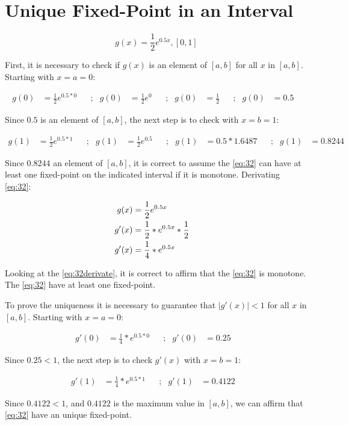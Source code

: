 \section{Unique Fixed-Point in an Interval}
	
	\begin{equation}
		g(x) = \frac{1}{2}e^{0.5x},[0,1]
	\label{eq:32}
	\end{equation}
		
	First, it is necessary to check if $g(x)$ is an element of $[a,b]$ for all $x$ in $[a,b]$. Starting with $x = a = 0$:
	
	\begin{align}
		g(0) &= \frac{1}{2}e^{0.5*0}& &;&
		g(0) &= \frac{1}{2}e^{0}& &;&
		g(0) &= \frac{1}{2}& &;&
		g(0) &= 0.5&
	\label{eq:320x}
	\end{align}

	Since $0.5$ is an element of $[a,b]$, the next step is to check with $x = b = 1$:

	\begin{align}
		g(1) &= \frac{1}{2}e^{0.5*1}& &;&
		g(1) &= \frac{1}{2}e^{0.5}& &;&
		g(1) &= 0.5*1.6487& &;&
		g(1) &= 0.8244&
	\label{eq:321x}
	\end{align}

	Since $0.8244$ an element of $[a,b]$, it is correct to assume the \cref{eq:32} can have at least one fixed-point on the indicated interval if it is monotone. Derivating \cref{eq:32}:

	\begin{align}
		g(x) &= \frac{1}{2}e^{0.5x}& \notag \\
		g'(x) &= \frac{1}{2}*e^{0.5x}*\frac{1}{2}& \notag \\
		g'(x) &= \frac{1}{4}*e^{0.5x}&
	\label{eq:32derivate}
	\end{align}

	Looking at the \cref{eq:32derivate}, it is correct to affirm that the \cref{eq:32} is monotone. The \cref{eq:32} have at least one fixed-point.

	To prove the uniqueness it is necessary to guarantee that $|g'(x)| < 1$ for all $x$ in $[a,b]$. Starting with $x = a = 0$:

	\begin{align}
		g'(0) &= \frac{1}{4}*e^{0.5*0}& &;&
		g'(0) &= 0.25&
	\label{eq:32derivate0x}
	\end{align}

	Since $0.25 < 1$, the next step is to check $g'(x)$ with $x = b = 1$:

	\begin{align}
		g'(1) &= \frac{1}{4}*e^{0.5*1}& &;&
		g'(1) &= 0.4122&
	\label{eq:32derivate1x}
	\end{align}

	Since $0.4122 < 1$, and $0.4122$ is the maximum value in $[a,b]$, we can affirm that \cref{eq:32} have an unique fixed-point.
